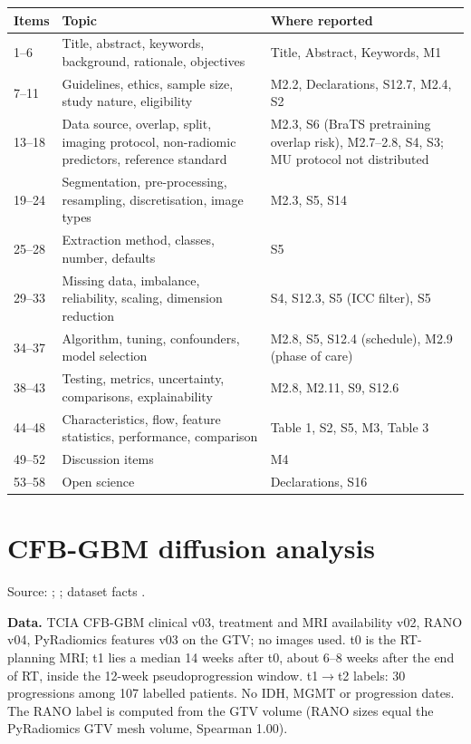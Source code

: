 \documentclass[11pt,a4paper]{article}
\begin{document}
\begin{table}[H]
\centering
\footnotesize
\begin{tabularx}{\linewidth}{@{}R{1.1cm} R{5.4cm} L@{}}
\toprule
Items & Topic & Where reported \\
--6 & Title, abstract, keywords, background, rationale, objectives & Title, Abstract, Keywords, M1 \\
7--11 & Guidelines, ethics, sample size, study nature, eligibility & M2.2, Declarations, S12.7, M2.4, S2 \\
13--18 & Data source, overlap, split, imaging protocol, non-radiomic predictors, reference standard & M2.3, S6 (BraTS pretraining overlap risk), M2.7--2.8, S4, S3; MU protocol not distributed \\
19--24 & Segmentation, pre-processing, resampling, discretisation, image types & M2.3, S5, S14 \\
25--28 & Extraction method, classes, number, defaults & S5 \\
29--33 & Missing data, imbalance, reliability, scaling, dimension reduction & S4, S12.3, S5 (ICC filter), S5 \\
34--37 & Algorithm, tuning, confounders, model selection & M2.8, S5, S12.4 (schedule), M2.9 (phase of care) \\
38--43 & Testing, metrics, uncertainty, comparisons, explainability & M2.8, M2.11, S9, S12.6 \\
44--48 & Characteristics, flow, feature statistics, performance, comparison & Table 1, S2, S5, M3, Table 3 \\
49--52 & Discussion items & M4 \\
53--58 & Open science & Declarations, S16  \\
\bottomrule
\end{tabularx}
\end{table}

\FloatBarrier
\section{CFB-GBM diffusion analysis}\label{sec:S18}

Source: ;
;
dataset facts .

\textbf{Data.} TCIA CFB-GBM clinical v03, treatment and MRI availability v02, RANO v04, PyRadiomics features
v03 on the GTV; no images used. t0 is the RT-planning MRI; t1 lies a median 14 weeks after t0, about 6--8
weeks after the end of RT, inside the 12-week pseudoprogression window. t1$\rightarrow$t2 labels: 30
progressions among 107 labelled patients. No IDH, MGMT or progression dates. The RANO label is computed from
the GTV volume (RANO sizes equal the PyRadiomics GTV mesh volume, Spearman 1.00).
\end{document}
